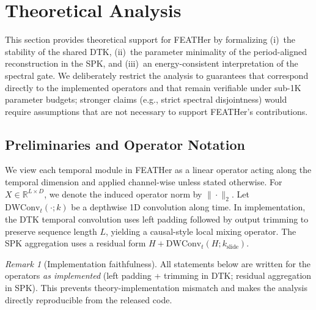 \documentclass[journal]{IEEEtran}
\theoremstyle{remark}
\newtheorem{remark}{Remark}
\begin{document}
\section{Theoretical Analysis}
\label{sec:theory}


This section provides theoretical support for FEATHer by formalizing
(i)~the stability of the shared DTK, (ii)~the parameter minimality of
the period-aligned reconstruction in the SPK, and (iii)~an
energy-consistent interpretation of the spectral gate. We deliberately
restrict the analysis to guarantees that correspond directly to the
implemented operators and that remain verifiable under sub-1K parameter
budgets; stronger claims (e.g., strict spectral disjointness) would
require assumptions that are not necessary to support FEATHer's
contributions.

\subsection{Preliminaries and Operator Notation}

We view each temporal module in FEATHer as a linear operator acting
along the temporal dimension and applied channel-wise unless stated
otherwise. For $X \in \mathbb{R}^{L \times D}$, we denote the induced
operator norm by $\|\cdot\|_2$. Let $\mathrm{DWConv}_t(\cdot;k)$ be a
depthwise 1D convolution along time. In implementation, the DTK
temporal convolution uses left padding followed by output trimming to
preserve sequence length $L$, yielding a causal-style local mixing
operator. The SPK aggregation uses a residual form
$H + \mathrm{DWConv}_t(H; k_{\mathrm{slide}})$.

\begin{remark}[Implementation faithfulness]
\label{rem:impl-faithful}
All statements below are written for the operators \emph{as
implemented} (left padding + trimming in DTK; residual aggregation in
SPK). This prevents theory-implementation mismatch and makes the
analysis directly reproducible from the released code.
\end{remark}
\end{document}
